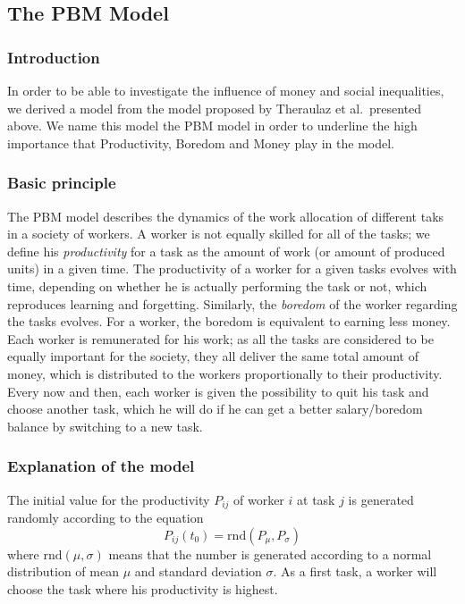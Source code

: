 \newcommand{\rnd}[2]{\mathrm{rnd}(#1,#2)}


\subsection{The PBM Model}

\subsubsection*{Introduction}
In order to be able to investigate the influence of money and social inequalities, we derived a model from the model proposed by Theraulaz et al.\ presented above. We name this model the PBM model in order to underline the high importance that Productivity, Boredom and Money play in the model.

\subsubsection*{Basic principle}
The PBM model describes the dynamics of the work allocation of different taks in a society of workers. 
A worker is not equally skilled for all of the tasks; we define his \emph{productivity} for a task as the amount of work (or amount of produced units) in a given time. 
The productivity of a worker for a given tasks evolves with time, depending on whether he is actually performing the task or not, which reproduces learning and forgetting. Similarly, the \emph{boredom} of the worker regarding the tasks evolves. For a worker, the boredom is equivalent to earning less money.
Each worker is remunerated for his work; as all the tasks are considered to be equally important for the society, they all deliver the same total amount of money, which is distributed to the workers proportionally to their productivity.
Every now and then, each worker is given the possibility to quit his task and choose another task, which he will do if he can get a better salary/boredom balance by switching to a new task. 


\subsubsection*{Explanation of the model}
The initial value for the productivity $P_{ij}$ of worker $i$ at task $j$ is generated randomly according to the equation
\begin{equation}
	P_{ij}(t_0) = \rnd{P_\mu}{P_\sigma}
\end{equation}
where $\rnd{\mu}{\sigma}$ means that the number is generated according to a normal distribution of mean $\mu$ and standard deviation $\sigma$.
As a first task, a worker will choose the task where his productivity is highest.


